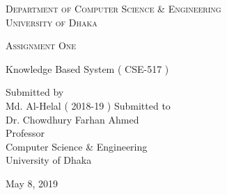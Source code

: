 \documentclass[a4paper,12pt]{article}
\begin{document}
\begin{titlepage}
\centering
{\scshape\LARGE Department of Computer Science \& Engineering\\University of Dhaka \par}
\vspace{1.5cm}
{\scshape\Large Assignment One\par}
\vfill
{\Large Knowledge Based System ( CSE-517 )\par}
\vspace{2cm}
{\Large Submitted by\\
\vspace{0.5cm}
 \centering Md. Al-Helal ( 2018-19 )}
\vfill
{\Large Submitted to\\
\vspace{0.5cm}
 Dr. Chowdhury Farhan Ahmed\\ Professor\\Computer Science \& Engineering\\University of Dhaka}
\vfill
{\large May 8, 2019\par}
\end{titlepage}
\end{document}
